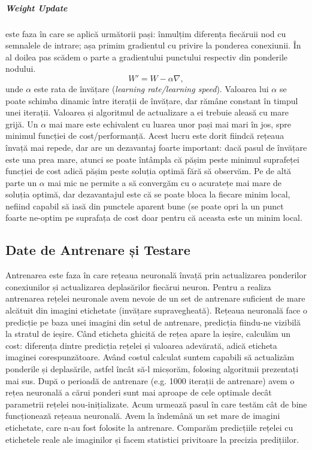 \subparagraph{Weight Update} este faza în care se aplică următorii pași: înmulțim diferența fiecăruii nod cu semnalele de intrare; așa primim gradientul cu privire la ponderea conexiunii. În al doilea pas scădem o parte a gradientului punctului respectiv din ponderile nodului.\newline
\begin{equation}
	W \prime = W-\alpha \nabla ,
\end{equation}
unde $\alpha$ este rata de învățare (\textit{learning rate/learning speed}). Valoarea lui $\alpha$ se poate schimba dinamic între iterații de învățare, dar rămâne constant în timpul unei iterații. Valoarea și algoritmul de actualizare a ei trebuie aleasă cu mare grijă. Un $\alpha$ mai mare este echivalent cu luarea unor pași mai mari în jos, spre minimul funcției de cost/performanță. Acest lucru este dorit fiindcă rețeaua învață mai repede, dar are un dezavantaj foarte important: dacă pasul de învățare este una prea mare, atunci se poate întâmpla că pășim peste minimul suprafeței funcției de cost adică pășim peste soluția optimă fără să observăm. Pe de altă parte un $\alpha$ mai mic ne permite a să convergăm cu o acuratețe mai mare de soluția optimă, dar dezavantajul este că se poate bloca la fiecare minim local, nefiind capabil să iasă din punctele aparent bune (se poate opri la un punct foarte ne-optim pe suprafața de cost doar pentru că aceasta este un minim local.

\subsection{Date de Antrenare și Testare}
Antrenarea este faza în care rețeaua neuronală învață prin actualizarea ponderilor conexiunilor și actualizarea deplasărilor fiecărui neuron. Pentru a realiza antrenarea rețelei neuronale avem nevoie de un set de antrenare suficient de mare alcătuit din imagini etichetate (invățare supravegheată). Rețeaua neuronală face o predicție pe baza unei imagini din setul de antrenare, predicția fiindu-ne vizibilă la stratul de ieșire. Când eticheta ghicită de rețea apare la ieșire, calculăm un cost: diferența dintre predicția rețelei și valoarea adevărată, adică eticheta imaginei corespunzătoare. Având costul calculat suntem capabili să actualizăm ponderile și deplasările, astfel încât să-l micșorăm, folosing algoritmii prezentați mai sus. După o perioadă de antrenare (e.g. 1000 iterații de antrenare) avem o rețea neuronală a cărui ponderi sunt mai aproape de cele optimale decât parametrii rețelei nou-inițializate.\newline
Acum urmează pasul în care testăm cât de bine funcționează rețeaua neuronală. Avem la îndemână un set mare de imagini etichetate, care n-au fost folosite la antrenare. Comparăm predicțiile rețelei cu etichetele reale ale imaginilor și facem statistici privitoare la precizia predițiilor.


